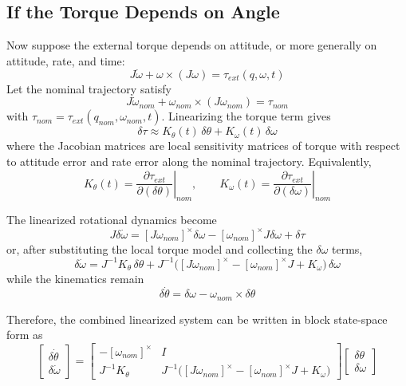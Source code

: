 \documentclass[11pt]{article}
\begin{document}
\subsection{If the Torque Depends on Angle}
Now suppose the external torque depends on attitude, or more generally on attitude, rate, and time:
\begin{equation}
    J \dot{\omega} + \omega \times (J\omega) = \tau_{ext}(q, \omega, t)
\end{equation}
Let the nominal trajectory satisfy
\begin{equation}
    J \dot{\omega}_{nom} + \omega_{nom} \times (J\omega_{nom}) = \tau_{nom}
\end{equation}
with $\tau_{nom} = \tau_{ext}(q_{nom}, \omega_{nom}, t)$. Linearizing the torque term gives
\begin{equation}
    \delta\tau \approx K_{\theta}(t) \, \delta\theta + K_{\omega}(t) \, \delta\omega
\end{equation}
where the Jacobian matrices are local sensitivity matrices of torque with respect to attitude error and rate error along the nominal trajectory. Equivalently,
\begin{equation}
    K_{\theta}(t) = \left. \frac{\partial \tau_{ext}}{\partial (\delta\theta)} \right|_{nom},
    \qquad
    K_{\omega}(t) = \left. \frac{\partial \tau_{ext}}{\partial (\delta\omega)} \right|_{nom}
\end{equation}

The linearized rotational dynamics become
\begin{equation}
    J\delta\dot{\omega} = [J\omega_{nom}]^\times \delta\omega - [\omega_{nom}]^\times J \delta\omega + \delta\tau
\end{equation}
or, after substituting the local torque model and collecting the $\delta\omega$ terms,
\begin{equation}
    \delta\dot{\omega} = J^{-1} K_{\theta} \, \delta\theta
    + J^{-1} \Big( [J\omega_{nom}]^\times - [\omega_{nom}]^\times J + K_{\omega} \Big) \, \delta\omega
\end{equation}
while the kinematics remain
\begin{equation}
    \delta\dot{\theta} = \delta\omega - \omega_{nom} \times \delta\theta
\end{equation}

Therefore, the combined linearized system can be written in block state-space form as
\begin{equation}
    \begin{bmatrix}
        \delta\dot{\theta} \\
        \delta\dot{\omega}
    \end{bmatrix}
    =
    \begin{bmatrix}
        -[\omega_{nom}]^\times & I \\
        J^{-1} K_{\theta} & J^{-1} \Big( [J\omega_{nom}]^\times - [\omega_{nom}]^\times J + K_{\omega} \Big)
    \end{bmatrix}
    \begin{bmatrix}
        \delta\theta \\
        \delta\omega
    \end{bmatrix}
\end{equation}
\end{document}
